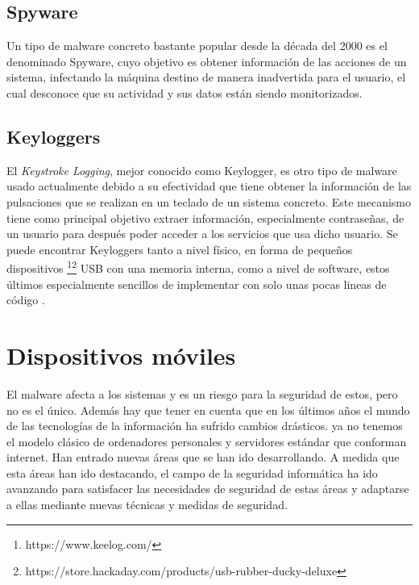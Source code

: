\subsection{Spyware}

Un tipo de malware concreto bastante popular desde la década del 2000 es el denominado Spyware, cuyo objetivo es obtener información de las acciones de un sistema, infectando la máquina destino de manera inadvertida para el usuario, el cual desconoce que su actividad y sus datos están siendo monitorizados.

\subsection{Keyloggers}

El \textit{Keystroke Logging}, mejor conocido como Keylogger, es otro tipo de malware usado actualmente debido a su efectividad que tiene obtener la información de las pulsaciones que se realizan en un teclado de un sistema concreto. Este mecanismo tiene como principal objetivo extraer información, especialmente contraseñas, de un usuario para después poder acceder a los servicios que usa dicho usuario. Se puede encontrar Keyloggers tanto a nivel físico, en forma de pequeños dispositivos \footnote{https://www.keelog.com/}\footnote{https://store.hackaday.com/products/usb-rubber-ducky-deluxe} USB con una memoria interna, como a nivel de software, estos últimos especialmente sencillos de implementar con solo unas pocas lineas de código \cite{ander-keylogger}.


\section{Dispositivos móviles}

El malware afecta a los sistemas y es un riesgo para la seguridad de estos, pero no es el único. Además hay que tener en cuenta que en los últimos años el mundo de las tecnologías de la información ha sufrido cambios drásticos. ya no tenemos el modelo clásico de ordenadores personales y servidores estándar que conforman internet. Han entrado nuevas áreas que se han ido desarrollando. A medida que esta áreas han ido destacando, el campo de la seguridad informática ha ido avanzando para satisfacer las necesidades de seguridad de estas áreas y adaptarse a ellas mediante nuevas técnicas y medidas de seguridad.


